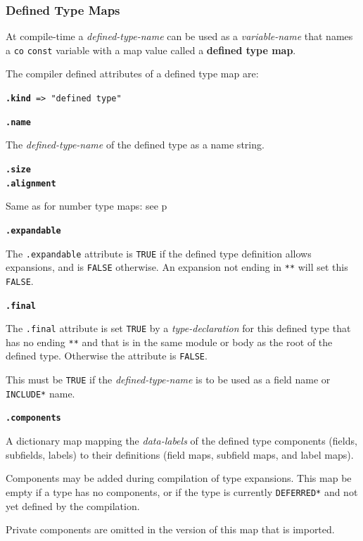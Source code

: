 \documentclass[12pt]{article}
\newcommand{\key}[1]{{\rm \bfseries #1}}
\newcommand{\ttkey}[1]{{\tt \bfseries #1}}
\newcommand{\pagref}[1]{p\pageref{#1}}
\newenvironment{indpar}[1][0.3in]%
	{\begin{list}{}%
		     {\setlength{\itemsep}{0in}%
		      \setlength{\topsep}{0in}%
		      \setlength{\parsep}{1ex}%
		      \setlength{\labelwidth}{#1}%
		      \setlength{\leftmargin}{#1}%
		      \addtolength{\leftmargin}{\labelsep}}%
	 \item}%
	{\end{list}}
\begin{document}
\subsubsection{Defined Type Maps}
\label{DEFINED-TYPE-MAPS}

At compile-time a {\em defined-type-name} can be used as a
{\em variable-name} that names a {\tt co} {\tt const} variable
with a map value called a \key{defined type map}.

The compiler defined attributes of a defined type map are:

{\tt \ttkey{.kind} => "defined type"}

\ttkey{.name}
\begin{indpar}
The {\em defined-type-name} of the defined type as a name string.
\end{indpar}

\ttkey{.size} \\
\ttkey{.alignment}
\begin{indpar}
Same as for number type maps: see \pagref{SIZE-AND-ALIGNMENT}
\end{indpar}

\ttkey{.expandable}
\begin{indpar}
The {\tt .expandable} attribute is {\tt TRUE} if the
defined type definition allows expansions, and is {\tt FALSE}
otherwise.  An expansion not ending in {\tt ***} will set
this {\tt FALSE}.
\end{indpar}

\ttkey{.final}
\begin{indpar}
The {\tt .final} attribute is set {\tt TRUE} by a {\em type-declaration}
for this defined type that has no
ending {\tt ***} and that is in the same module or body as
the root of the defined type.  Otherwise the attribute is
{\tt FALSE}.

This must be {\tt TRUE} if the {\em defined-type-name} is to be
used as a field name or {\tt *INCLUDE*} name.
\end{indpar}

\ttkey{.components}
\begin{indpar}
A dictionary map mapping the {\em data-labels} of the defined type
components (fields, subfields, labels) to their definitions
(field maps, subfield maps, and label maps).

Components may be added during compilation of type expansions.
This map be empty if a type has no components, or if the type is
currently {\tt *DEFERRED*} and not yet defined by the
compilation.

Private components are omitted in the version of this map
that is imported.
\end{indpar}
\end{document}

